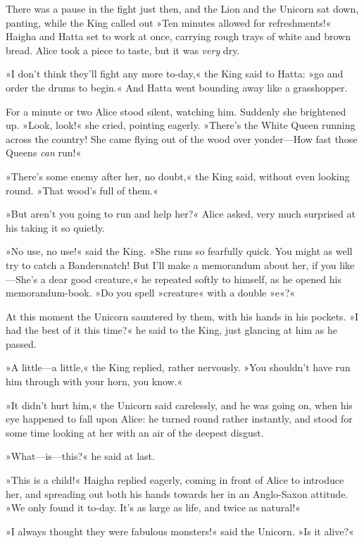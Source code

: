 There was a pause in the fight just then, and the Lion and the Unicorn sat down, panting, while the King called out »Ten minutes allowed for refreshments!« Haigha and Hatta set to work at once, carrying rough trays of white and brown bread. Alice took a piece to taste, but it was \textit{very} dry.

»I don't think they'll fight any more to-day,« the King said to Hatta: »go and order the drums to begin.« And Hatta went bounding away like a grasshopper.

For a minute or two Alice stood silent, watching him. Suddenly she brightened up. »Look, look!« she cried, pointing eagerly. »There's the White Queen running across the country! She came flying out of the wood over yonder—How fast those Queens \textit{can} run!«

\label{black5}

»There's some enemy after her, no doubt,« the King said, without even looking round. »That wood's full of them.«

»But aren't you going to run and help her?« Alice asked, very much surprised at his taking it so quietly.

»No use, no use!« said the King. »She runs so fearfully quick. You might as well try to catch a Bandersnatch! But I'll make a memorandum about her, if you like—She's a dear good creature,« he repeated softly to himself, as he opened his memorandum-book. »Do you spell »creature« with a double »e«?«

At this moment the Unicorn sauntered by them, with his hands in his pockets. »I had the best of it this time?« he said to the King, just glancing at him as he passed.

»A little—a little,« the King replied, rather nervously. »You shouldn't have run him through with your horn, you know.«

»It didn't hurt him,« the Unicorn said carelessly, and he was going on, when his eye happened to fall upon Alice: he turned round rather instantly, and stood for some time looking at her with an air of the deepest disgust.

»What—is—this?« he said at last.

»This is a child!« Haigha replied eagerly, coming in front of Alice to introduce her, and spreading out both his hands towards her in an Anglo-Saxon attitude. »We only found it to-day. It's as large as life, and twice as natural!«

»I always thought they were fabulous monsters!« said the Unicorn. »Is it alive?«

